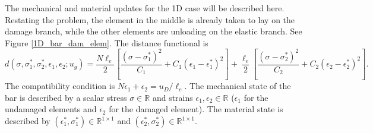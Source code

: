 \documentclass[10pt]{cas-sc}
\begin{document}
The mechanical and material updates for the 1D case will be described here. Restating the problem, the element in the middle is already taken to lay on the damage branch, while the other elements are unloading on the elastic branch. See Figure \ref{1D_bar_dam_elem}. The distance functional is 
\begin{equation*}
 	d(\sigma,\sigma_1^*,\sigma_2^*,\epsilon_1,\epsilon_2;u_g) = \frac{N \ell_e}{2} \left[ \frac{(\sigma - \sigma_1^*)^2}{C_1} +  C_1(\epsilon_1 - \epsilon_1^*)^2 \right] + \frac{\ell_e}{2}  \left[ \frac{(\sigma - \sigma_2^*)^2}{C_2} +  C_2(\epsilon_2 - \epsilon_2^*)^2 \right].
\end{equation*}
The compatibility condition is $N \epsilon_1 + \epsilon_2 = u_D/\ell_e$. The mechanical state of the bar is described by a scalar stress $\sigma \in \mathbb{R}$ and strains $\epsilon_1, \epsilon_2 \in \mathbb{R}$ ($\epsilon_1$ for the undamaged elements and $\epsilon_2$ for the damaged element). The material state is described by $(\epsilon_1^*, \sigma_1^*) \in \mathbb{R}^{1\times 1}$ and $(\epsilon_2^*, \sigma_2^*) \in \mathbb{R}^{1\times 1}$.
\end{document}
